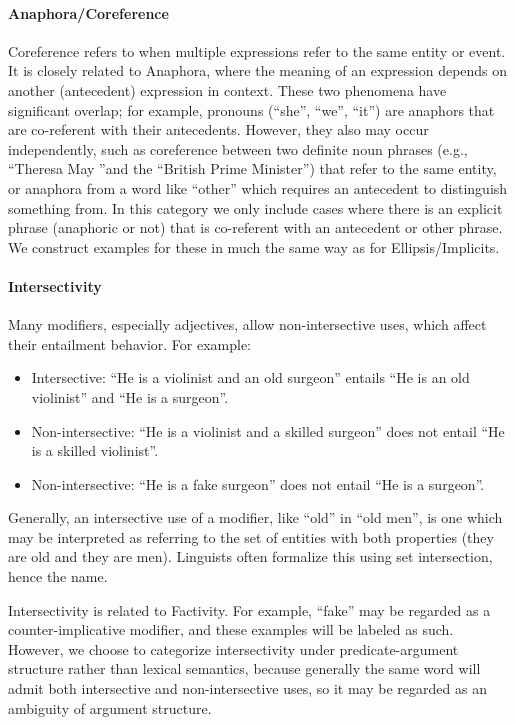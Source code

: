 \documentclass{article} \usepackage{iclr2019_conference,times}
\begin{document}
\paragraph{Anaphora/Coreference} Coreference refers to when multiple expressions refer to the same entity or event. It is closely related to Anaphora, where the meaning of an expression depends on another (antecedent) expression in context. These two phenomena have significant overlap; for example, pronouns (``she'', ``we'', ``it'') are anaphors that are co-referent with their antecedents. However, they also may occur independently, such as coreference between two definite noun phrases (e.g., ``Theresa May ''and the ``British Prime Minister'') that refer to the same entity, or anaphora from a word like ``other'' which requires an antecedent to distinguish something from. In this category we only include cases where there is an explicit phrase (anaphoric or not) that is co-referent with an antecedent or other phrase. We construct examples for these in much the same way as for Ellipsis/Implicits.

\paragraph{Intersectivity} Many modifiers, especially adjectives, allow non-intersective uses, which affect their entailment behavior. For example:
\begin{itemize}
    \item Intersective: ``He is a violinist and an old surgeon'' entails ``He is an old violinist'' and ``He is a surgeon''.
    \item Non-intersective: ``He is a violinist and a skilled surgeon'' does not entail ``He is a skilled violinist''.
    \item Non-intersective: ``He is a fake surgeon'' does not entail ``He is a surgeon''.
\end{itemize}
Generally, an intersective use of a modifier, like ``old'' in ``old men'', is one which may be interpreted as referring to the set of entities with both properties (they are old and they are men). Linguists often formalize this using set intersection, hence the name.

Intersectivity is related to Factivity. For example, ``fake'' may be regarded as a counter-implicative modifier, and these examples will be labeled as such. However, we choose to categorize intersectivity under predicate-argument structure rather than lexical semantics, because generally the same word will admit both intersective and non-intersective uses, so it may be regarded as an ambiguity of argument structure.
\end{document}
